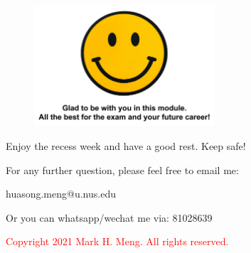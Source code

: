 \begin{frame}{}
	\begin{figure}
		\includegraphics[width=0.6\textwidth, trim=0 3.5cm 0 0, clip]{t5/images/final.png}
	\end{figure}
\begin{center}
	Enjoy the recess week and have a good rest. Keep safe!
\end{center} 
\end{frame}
\begin{frame}{}
	\centering  
	For any further question, please feel free to email me:\vspace{10pt}
	
	huasong.meng@u.nus.edu\\\vspace{3pt}
	
	Or you can whatsapp/wechat me via: 81028639 \vspace{20pt}
	
	\begin{tcolorbox}
		\begin{center}
			\textcolor{red}{Copyright 2021 Mark H. Meng. All rights reserved.}
		\end{center}
	\end{tcolorbox}
\end{frame}